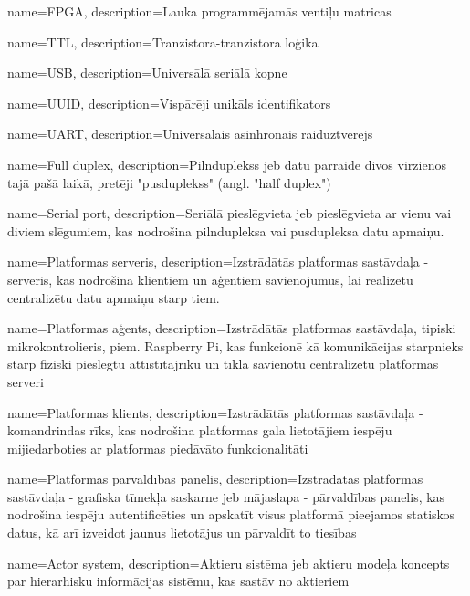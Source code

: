 \makeglossaries

{
    name=FPGA,
    description={Lauka programmējamās ventiļu matricas}
}

{
    name=TTL,
    description={Tranzistora-tranzistora loģika}
}

{
    name=USB,
    description={Universālā seriālā kopne}
}

{
    name=UUID,
    description={Vispārēji unikāls identifikators}
}

{
    name=UART,
    description={Universālais asinhronais raiduztvērējs}
}

{
    name=Full duplex,
    description={Pilnduplekss jeb datu pārraide divos virzienos tajā pašā laikā, pretēji "pusduplekss" (angl. "half duplex")}
}

{
    name=Serial port,
    description={Seriālā pieslēgvieta jeb pieslēgvieta ar vienu vai diviem slēgumiem, kas nodrošina pilndupleksa 
        vai pusdupleksa datu apmaiņu.}
}

{
    name=Platformas serveris,
    description={Izstrādātās platformas sastāvdaļa - serveris, kas nodrošina klientiem un aģentiem savienojumus, 
        lai realizētu centralizētu datu apmaiņu starp tiem.}
}

{
    name=Platformas aģents,
    description={Izstrādātās platformas sastāvdaļa, tipiski mikrokontrolieris, piem. Raspberry Pi, kas 
        funkcionē kā komunikācijas starpnieks starp fiziski pieslēgtu attīstītājrīku un tīklā 
        savienotu centralizētu platformas serveri}
}

{
    name=Platformas klients,
    description={Izstrādātās platformas sastāvdaļa - komandrindas rīks, kas nodrošina platformas gala lietotājiem
        iespēju mijiedarboties ar platformas piedāvāto funkcionalitāti}
}

{
    name=Platformas pārvaldības panelis,
    description={Izstrādātās platformas sastāvdaļa - grafiska tīmekļa saskarne jeb mājaslapa - pārvaldības panelis, 
        kas nodrošina iespēju autentificēties un apskatīt visus platformā pieejamos statiskos datus, kā arī izveidot
        jaunus lietotājus un pārvaldīt to tiesības}
}

{
    name=Actor system,
    description={Aktieru sistēma jeb aktieru modeļa koncepts par hierarhisku informācijas sistēmu, kas sastāv no aktieriem}
}

